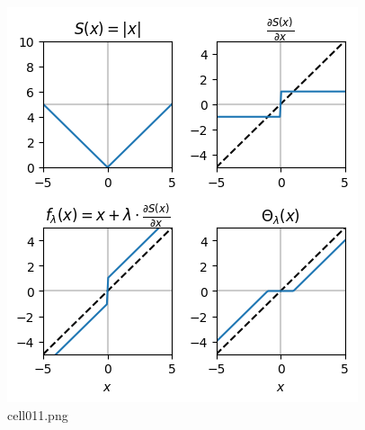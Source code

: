 \begin{figure}[ht]
	\centering
	\includegraphics[scale=0.8, max width=\linewidth]{./fig/energy-based-model/sparse-coding/cell011.png}
	\caption{cell011.png}
	\label{cell011.png}
\end{figure}